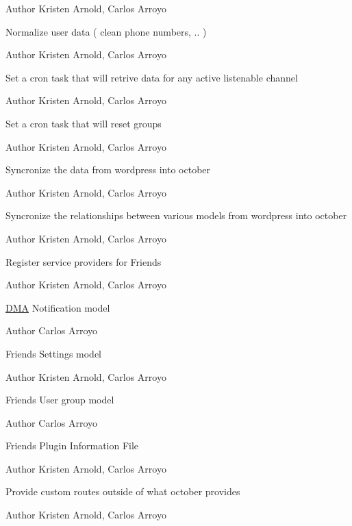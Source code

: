 \begin{DoxyAuthor}{Author}
Kristen Arnold, Carlos Arroyo
\end{DoxyAuthor}
Normalize user data ( clean phone numbers, .. )

\begin{DoxyAuthor}{Author}
Kristen Arnold, Carlos Arroyo
\end{DoxyAuthor}
Set a cron task that will retrive data for any active listenable channel

\begin{DoxyAuthor}{Author}
Kristen Arnold, Carlos Arroyo
\end{DoxyAuthor}
Set a cron task that will reset groups

\begin{DoxyAuthor}{Author}
Kristen Arnold, Carlos Arroyo
\end{DoxyAuthor}
Syncronize the data from wordpress into october

\begin{DoxyAuthor}{Author}
Kristen Arnold, Carlos Arroyo
\end{DoxyAuthor}
Syncronize the relationships between various models from wordpress into october

\begin{DoxyAuthor}{Author}
Kristen Arnold, Carlos Arroyo
\end{DoxyAuthor}
Register service providers for Friends

\begin{DoxyAuthor}{Author}
Kristen Arnold, Carlos Arroyo
\end{DoxyAuthor}
\hyperlink{namespaceDMA}{D\+M\+A} Notification model  \begin{DoxyAuthor}{Author}
Carlos Arroyo
\end{DoxyAuthor}
Friends Settings model  \begin{DoxyAuthor}{Author}
Kristen Arnold, Carlos Arroyo
\end{DoxyAuthor}
Friends User group model  \begin{DoxyAuthor}{Author}
Carlos Arroyo
\end{DoxyAuthor}
Friends Plugin Information File

\begin{DoxyAuthor}{Author}
Kristen Arnold, Carlos Arroyo
\end{DoxyAuthor}
Provide custom routes outside of what october provides

\begin{DoxyAuthor}{Author}
Kristen Arnold, Carlos Arroyo 
\end{DoxyAuthor}
